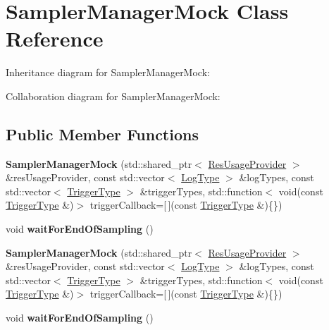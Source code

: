 \hypertarget{classSamplerManagerMock}{}\section{Sampler\+Manager\+Mock Class Reference}
\label{classSamplerManagerMock}


Inheritance diagram for Sampler\+Manager\+Mock\+:


Collaboration diagram for Sampler\+Manager\+Mock\+:
\subsection*{Public Member Functions}
\begin{DoxyCompactItemize}
\item 
{\bfseries Sampler\+Manager\+Mock} (std\+::shared\+\_\+ptr$<$ \hyperlink{classResUsageProvider}{Res\+Usage\+Provider} $>$ \&res\+Usage\+Provider, const std\+::vector$<$ \hyperlink{structLogType}{Log\+Type} $>$ \&log\+Types, const std\+::vector$<$ \hyperlink{structTriggerType}{Trigger\+Type} $>$ \&trigger\+Types, std\+::function$<$ void(const \hyperlink{structTriggerType}{Trigger\+Type} \&)$>$ trigger\+Callback=\mbox{[}$\,$\mbox{]}(const \hyperlink{structTriggerType}{Trigger\+Type} \&)\{\})\hypertarget{classSamplerManagerMock_a289dc0f60cc77495bf4df1bcf1fb5258}{}\label{classSamplerManagerMock_a289dc0f60cc77495bf4df1bcf1fb5258}

\item 
void {\bfseries wait\+For\+End\+Of\+Sampling} ()\hypertarget{classSamplerManagerMock_a1ddddf0f73a9deeb3bfef2ace3fc00d8}{}\label{classSamplerManagerMock_a1ddddf0f73a9deeb3bfef2ace3fc00d8}

\item 
{\bfseries Sampler\+Manager\+Mock} (std\+::shared\+\_\+ptr$<$ \hyperlink{classResUsageProvider}{Res\+Usage\+Provider} $>$ \&res\+Usage\+Provider, const std\+::vector$<$ \hyperlink{structLogType}{Log\+Type} $>$ \&log\+Types, const std\+::vector$<$ \hyperlink{structTriggerType}{Trigger\+Type} $>$ \&trigger\+Types, std\+::function$<$ void(const \hyperlink{structTriggerType}{Trigger\+Type} \&)$>$ trigger\+Callback=\mbox{[}$\,$\mbox{]}(const \hyperlink{structTriggerType}{Trigger\+Type} \&)\{\})\hypertarget{classSamplerManagerMock_a289dc0f60cc77495bf4df1bcf1fb5258}{}\label{classSamplerManagerMock_a289dc0f60cc77495bf4df1bcf1fb5258}

\item 
void {\bfseries wait\+For\+End\+Of\+Sampling} ()\hypertarget{classSamplerManagerMock_a1ddddf0f73a9deeb3bfef2ace3fc00d8}{}\label{classSamplerManagerMock_a1ddddf0f73a9deeb3bfef2ace3fc00d8}

\end{DoxyCompactItemize}
